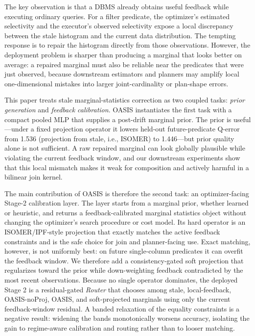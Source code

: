 \documentclass[preprint,12pt]{elsarticle}
\begin{document}
The key observation is that a DBMS already obtains useful feedback while
executing ordinary queries. For a filter predicate, the optimizer's estimated
selectivity and the executor's observed selectivity expose a local discrepancy
between the stale histogram and the current data distribution. The tempting
response is to repair the histogram directly from those observations. However,
the deployment problem is sharper than producing a marginal that looks better on
average: a repaired marginal must also be reliable near the predicates that were
just observed, because downstream estimators and planners may amplify local
one-dimensional mistakes into larger joint-cardinality or plan-shape errors.

This paper treats stale marginal-statistics correction as two coupled tasks:
\emph{prior generation} and \emph{feedback calibration}. OASIS instantiates the
first task with a compact pooled MLP that supplies a post-drift marginal prior.
The prior is useful---under a fixed projection operator it lowers held-out
future-predicate Q-error from 1.536 (projection from stale, i.e., ISOMER) to
1.446---but prior quality alone is not sufficient. A raw repaired marginal can
look globally plausible while violating the current feedback window, and our
downstream experiments show that this local mismatch makes it weak for
composition and actively harmful in a bilinear join kernel.

The main contribution of OASIS is therefore the second task: an
optimizer-facing Stage-2 calibration layer. The layer starts from a marginal
prior, whether learned or heuristic, and returns a feedback-calibrated marginal
statistics object without changing the optimizer's search procedure or cost
model. Its hard operator is an ISOMER/IPF-style projection that exactly matches
the active feedback constraints and is the safe choice for join and
planner-facing use. Exact matching, however, is not uniformly best: on future
single-column predicates it can overfit the feedback window. We therefore add a
consistency-gated soft projection that regularizes toward the prior while
down-weighting feedback contradicted by the most recent observations. Because no
single operator dominates, the deployed Stage 2 is a residual-gated
\emph{Router} that chooses among stale, local-feedback, OASIS-noProj, OASIS,
and soft-projected marginals using only the current
feedback-window residual. A banded relaxation of the equality constraints is a
negative result: widening the bands monotonically worsens accuracy, isolating
the gain to regime-aware calibration and routing rather than to looser matching.
\end{document}
